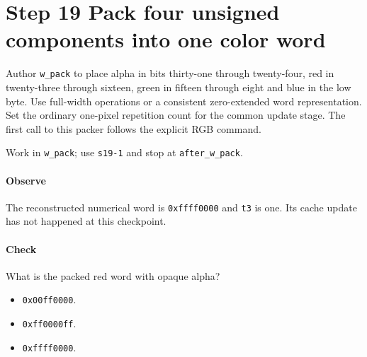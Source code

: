 \section{Step 19 Pack four unsigned components into one color word}\label{qoi-s19}
Author \texttt{w\_pack} to place alpha in bits thirty-one through twenty-four, red in twenty-three through sixteen, green in fifteen through eight and blue in the low byte. Use full-width operations or a consistent zero-extended word representation. Set the ordinary one-pixel repetition count for the common update stage. The first call to this packer follows the explicit RGB command.

Work in \texttt{w\_pack}; use \texttt{s19-1} and stop at \texttt{after\_w\_pack}.

\paragraph{Observe} The reconstructed numerical word is \texttt{0xffff0000} and \texttt{t3} is one. Its cache update has not happened at this checkpoint.

\paragraph{Check} What is the packed red word with opaque alpha?
\begin{itemize}
  \item[A.] \texttt{0x00ff0000}.
  \item[B.] \texttt{0xff0000ff}.
  \item[C.] \texttt{0xffff0000}.
\end{itemize}

